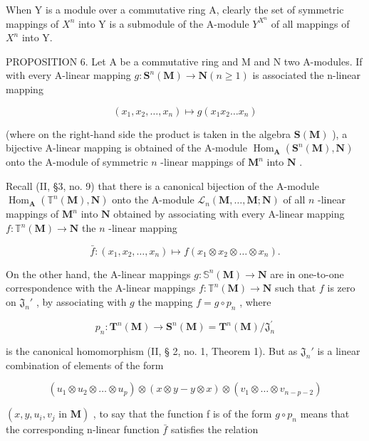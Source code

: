 When Y is a module over a commutative ring A, clearly the set of symmetric mappings of \(X^{n}\) into Y is a submodule of the A-module \(Y^{X^{n}}\) of all mappings of \(X^{n}\) into Y.

PROPOSITION 6. Let A be a commutative ring and M and N two A-modules. If with every A-linear mapping \(g: \mathbf{S}^n(\mathbf{M}) \to \mathbf{N} (n \geqslant 1)\) is associated the n-linear mapping

\[
\left(x _ {1}, x _ {2}, \dots , x _ {n}\right) \mapsto g \left(x _ {1} x _ {2} \dots x _ {n}\right)\tag{6}
\]

(where on the right-hand side the product is taken in the algebra \(\mathbf{S}(\mathbf{M})\) ), a bijective A-linear mapping is obtained of the A-module \(\operatorname{Hom}_{\mathbf{A}}(\mathbf{S}^{n}(\mathbf{M}), \mathbf{N})\) onto the A-module of symmetric \(n\) -linear mappings of \(\mathbf{M}^{n}\) into \(\mathbf{N}\) .

Recall (II, §3, no. 9) that there is a canonical bijection of the A-module \(\operatorname{Hom}_{\mathbf{A}}(\mathbb{T}^{n}(\mathbf{M}), \mathbf{N})\) onto the A-module \(\mathcal{L}_{n}(\mathbf{M}, \ldots, \mathbf{M}; \mathbf{N})\) of all \(n\) -linear mappings of \(\mathbf{M}^{n}\) into \(\mathbf{N}\) obtained by associating with every A-linear mapping \(f: \mathbb{T}^{n}(\mathbf{M}) \to \mathbf{N}\) the \(n\) -linear mapping

\[
\bar {f} \colon (x _ {1}, x _ {2}, \dots , x _ {n}) \mapsto f (x _ {1} \otimes x _ {2} \otimes \dots \otimes x _ {n}).\tag{7}
\]

On the other hand, the A-linear mappings \(g \colon \mathbb{S}^n(\mathbf{M}) \to \mathbf{N}\) are in one-to-one correspondence with the A-linear mappings \(f \colon \mathbb{T}^n(\mathbf{M}) \to \mathbf{N}\) such that \(f\) is zero on \(\mathfrak{J}_n'\) , by associating with \(g\) the mapping \(f = g \circ p_n\) , where

\[
p _ {n} \colon \mathbf {T} ^ {n} (\mathbf {M}) \rightarrow \mathbf {S} ^ {n} (\mathbf {M}) = \mathbf {T} ^ {n} (\mathbf {M}) / \mathfrak {J} _ {n} ^ {\prime}
\]

is the canonical homomorphism (II, § 2, no. 1, Theorem 1). But as \(\mathfrak{J}_n'\) is a linear combination of elements of the form

\[
\left(u _ {1} \otimes u _ {2} \otimes \dots \otimes u _ {p}\right) \otimes (x \otimes y - y \otimes x) \otimes \left(v _ {1} \otimes \dots \otimes v _ {n - p - 2}\right)
\]

\((x, y, u_{i}, v_{j} \text{ in } \mathbf{M})\) , to say that the function f is of the form \(g \circ p_{n}\) means that the corresponding n-linear function \(\bar{f}\) satisfies the relation

